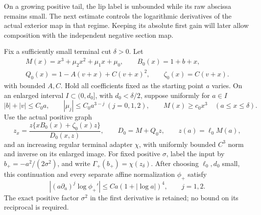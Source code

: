 On a growing positive tail, the lip label is unbounded while its raw
abscissa remains small. The next estimate controls the logarithmic
derivatives of the actual exterior map in that regime. Keeping its
absolute first gain will later allow composition with the independent
negative section map.

\begin{lemma}
\label{deg:lem-raw-growing-section}
Fix a sufficiently small terminal cut \(\delta>0\). Let
\[
 \begin{gathered}
 M(x)=x^3+\mu_2x^2+\mu_1x+\mu_0,\qquad B_0(x)=1+b+x,\\
 Q_0(x)=1-A(v+x)+C(v+x)^2,\qquad \zeta_0(x)=C(v+x).
 \end{gathered}
\]
with bounded \(A,C\). Hold all coefficients fixed as the starting
point \(a\) varies. On an enlarged interval \(I\subset(0,d_0]\),
with \(d_0<\delta/2\), suppose uniformly for \(a\in I\)
\[
 |b|+|v|\le C_0a,\qquad |\mu_j|\le C_0a^{3-j}\ (j=0,1,2),
 \qquad M(x)\ge c_0x^3\quad(a\le x\le\delta).
\]
Use the actual positive graph
\begin{equation}
 z_x=\frac{z\{xB_0(x)+\zeta_0(x)z\}}{D_0(x,z)},\qquad
 D_0=M+Q_0z,\qquad z(a)=\ell_0M(a),
 \label{deg:weighted-raw-positive-graph}
\end{equation}
and an increasing regular terminal adapter \(\chi\), with uniformly bounded
\(C^3\) norm and inverse on its enlarged image. For fixed positive
\(\sigma\), label the input by \(b_+=-a^2/(2\sigma^2)\), and write
\(\Gamma_+(b_+)=\chi(z_\delta)\). After choosing \(\ell_0,d_0\)
small, this continuation and every separate affine normalization
\(\phi_+\) satisfy
\begin{equation}
 |(a\partial_a)^j\log\phi_+'|\le Ca(1+|\log a|)^4,
 \qquad j=1,2.
 \label{deg:raw-growing-section-jets}
\end{equation}
The exact positive factor \(\sigma^2\) in the first derivative is
retained; no bound on its reciprocal is required.
\end{lemma}
